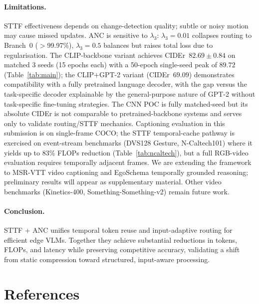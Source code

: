 \documentclass{article}
\begin{document}
\paragraph{Limitations.}
STTF effectiveness depends on change-detection quality; subtle or noisy motion may cause missed updates. ANC is sensitive to $\lambda_3$: $\lambda_3{=}0.01$ collapses routing to Branch~0 ($>$99.97\%), $\lambda_3{=}0.5$ balances but raises total loss due to regularisation. The CLIP-backbone variant achieves CIDEr~$82.69 \pm 0.84$ on matched 3 seeds (15 epochs each) with a 50-epoch single-seed peak of $89.72$ (Table~\ref{tab:main}); the CLIP+GPT-2 variant (CIDEr~$69.09$) demonstrates compatibility with a fully pretrained language decoder, with the gap versus the task-specific decoder explainable by the general-purpose nature of GPT-2 without task-specific fine-tuning strategies. The CNN POC is fully matched-seed but its absolute CIDEr is not comparable to pretrained-backbone systems and serves only to validate routing/STTF mechanics. Captioning evaluation in this submission is on single-frame COCO; the STTF temporal-cache pathway is exercised on event-stream benchmarks (DVS128 Gesture, N-Caltech101) where it yields up to 83\% FLOPs reduction (Table~\ref{tab:ncaltech}), but a full RGB-video evaluation requires temporally adjacent frames. We are extending the framework to MSR-VTT video captioning and EgoSchema temporally grounded reasoning; preliminary results will appear as supplementary material. Other video benchmarks (Kinetics-400, Something-Something-v2) remain future work.

\paragraph{Conclusion.}
STTF + ANC unifies temporal token reuse and input-adaptive routing for efficient edge VLMs. Together they achieve substantial reductions in tokens, FLOPs, and latency while preserving competitive accuracy, validating a shift from static compression toward structured, input-aware processing.


\section*{References}
\medskip
\end{document}
